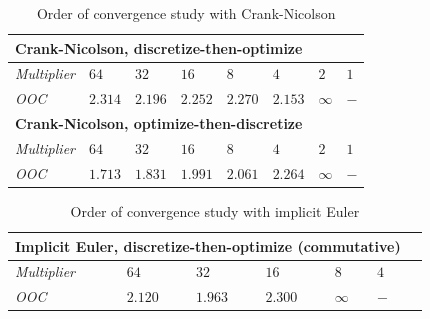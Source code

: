 \documentclass[english,a4paper,9pt,oneside]{scrbook}	%
\theoremstyle{break}
\theoremstyle{remark}
\begin{document}
\begin{table}[h]
\centering
\begin{tabular}{llllllll}
\hline
\multicolumn{8}{l}{\textbf{Crank-Nicolson, discretize-then-optimize}} \\ \hline
\textit{Multiplier} & $64$ & $32$ & $16$ & $8$ & $4$ & $2$ & $1$\\ \hline
\textit{OOC} & $2.314$ & $2.196$ & $2.252$ & $2.270$ & $2.153$ & $\infty$ & $-$ \\ \hline
\multicolumn{8}{l}{\textbf{Crank-Nicolson, optimize-then-discretize}} \\ \hline
\textit{Multiplier} & $64$ & $32$ & $16$ & $8$ & $4$ & $2$ & $1$\\ \hline
\textit{OOC} & $1.713$ & $1.831$ & $1.991$ & $2.061$ & $2.264$ & $\infty$ & $-$ \\ \hline
\end{tabular}
\caption{Order of convergence study with Crank-Nicolson}\label{tab:ooc_CN}
\end{table}


\begin{table}[h]
\centering
\begin{tabular}{lllllll}
\hline
\multicolumn{6}{l}{\textbf{Implicit Euler, discretize-then-optimize (commutative)}} \\ \hline
\textit{Multiplier} & $64$ & $32$ & $16$ & $8$ & $4$\\ \hline
\textit{OOC} & $2.120$ & $1.963$ & $2.300$ & $\infty$ & $-$ \\ \hline
\end{tabular}
\caption{Order of convergence study with implicit Euler}\label{tab:ooc_IE}
\end{table}
\end{document}

